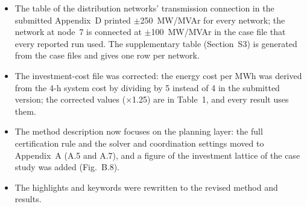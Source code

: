 \documentclass[11pt]{article}
\begin{document}
\begin{itemize}[leftmargin=*]
  \item The table of the distribution networks' transmission connection in the submitted Appendix~D printed $\pm$250~MW/MVAr for every network; the network at node~7 is connected at $\pm$100~MW/MVAr in the case file that every reported run used. The supplementary table (Section~S3) is generated from the case files and gives one row per network.
  \item The investment-cost file was corrected: the energy cost per MWh was derived from the 4-h system cost by dividing by 5 instead of 4 in the submitted version; the corrected values (×1.25) are in Table~1, and every result uses them.
  \item The method description now focuses on the planning layer: the full certification rule and the solver and coordination settings moved to Appendix~A (A.5 and A.7), and a figure of the investment lattice of the case study was added (Fig.~B.8).
  \item The highlights and keywords were rewritten to the revised method and results.
\end{itemize}
\end{document}
